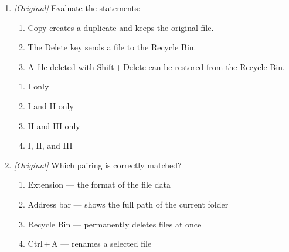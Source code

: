 \documentclass[11pt]{article}
\begin{document}
\begin{enumerate}[label=\textbf{Q\arabic*.}, leftmargin=*]
\begin{enumerate}[label=\Alph*.]
    \item Ctrl\,+\,P
    \item Alt\,+\,Enter
    \item Ctrl\,+\,Enter
    \item Alt\,+\,P
  \end{enumerate}
\item \textit{[Original]} Evaluate the statements:
  \begin{enumerate}[label=\Roman*.]
    \item Copy creates a duplicate and keeps the original file.
    \item The Delete key sends a file to the Recycle Bin.
    \item A file deleted with Shift\,+\,Delete can be restored from the
      Recycle Bin.
  \end{enumerate}
  \begin{enumerate}[label=\Alph*.]
    \item I only
    \item I and II only
    \item II and III only
    \item I, II, and III
  \end{enumerate}
\item \textit{[Original]} Which pairing is correctly matched?
  \begin{enumerate}[label=\Alph*.]
    \item Extension --- the format of the file data
    \item Address bar --- shows the full path of the current folder
    \item Recycle Bin --- permanently deletes files at once
    \item Ctrl\,+\,A --- renames a selected file
  \end{enumerate}


\end{enumerate}
\end{document}
